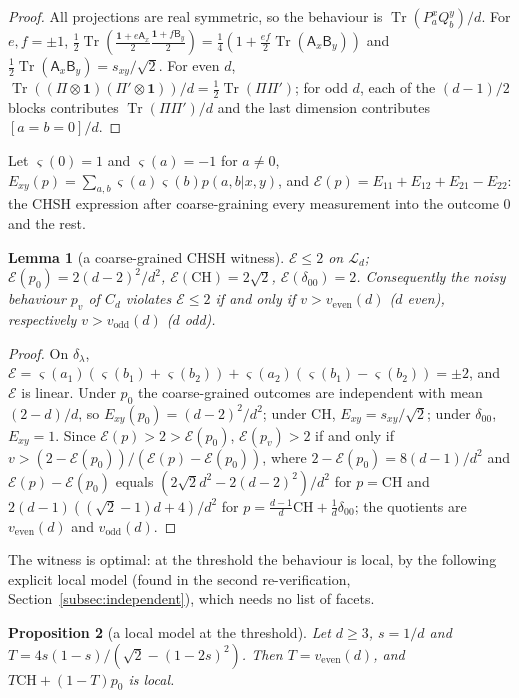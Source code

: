 \documentclass[11pt]{article}
\newtheorem{lemma}{Lemma}[section]
\newtheorem{proposition}[lemma]{Proposition}
\theoremstyle{remark}
\numberwithin{equation}{section}
\newcommand{\Tr}{\operatorname{Tr}}
\newcommand{\one}{\mathbf{1}}
\newcommand{\cL}{\mathcal{L}}
\newcommand{\cE}{\mathcal{E}}
\newcommand{\veven}{v_{\mathrm{even}}}
\newcommand{\vodd}{v_{\mathrm{odd}}}
\newcommand{\CH}{\mathrm{CH}}
\newcommand{\sA}{\mathsf{A}}
\newcommand{\sB}{\mathsf{B}}
\begin{document}
\begin{proof}
All projections are real symmetric, so the behaviour is $\Tr(P^x_aQ^y_b)/d$. For $e,f=\pm1$,
$\frac12\Tr(\frac{\one+e\sA_x}2\frac{\one+f\sB_y}2)=\frac14(1+\frac{ef}2\Tr(\sA_x\sB_y))$ and
$\frac12\Tr(\sA_x\sB_y)=s_{xy}/\sqrt2$. For even $d$, $\Tr((\Pi\otimes\one)(\Pi'\otimes\one))/d=\frac12\Tr(\Pi\Pi')$; for odd
$d$, each of the $(d-1)/2$ blocks contributes $\Tr(\Pi\Pi')/d$ and the last dimension contributes $[a=b=0]/d$.
\end{proof}

Let $\varsigma(0)=1$ and $\varsigma(a)=-1$ for $a\ne0$, $E_{xy}(p)=\sum_{a,b}\varsigma(a)\varsigma(b)p(a,b|x,y)$, and
$\cE(p)=E_{11}+E_{12}+E_{21}-E_{22}$: the CHSH expression after coarse-graining every measurement into the outcome $0$
and the rest.

\begin{lemma}[a coarse-grained CHSH witness]\label{lem:witness}
$\cE\le2$ on $\cL_d$; $\cE(p_0)=2(d-2)^2/d^2$, $\cE(\CH)=2\sqrt2$, $\cE(\delta_{00})=2$. Consequently the noisy behaviour
$p_v$ of $C_d$ violates $\cE\le2$ if and only if $v>\veven(d)$ \textup{(}$d$ even\textup{)}, respectively $v>\vodd(d)$
\textup{(}$d$ odd\textup{)}.
\end{lemma}

\begin{proof}
On $\delta_\lambda$, $\cE=\varsigma(a_1)(\varsigma(b_1)+\varsigma(b_2))+\varsigma(a_2)(\varsigma(b_1)-\varsigma(b_2))=\pm2$, and $\cE$ is
linear. Under $p_0$ the coarse-grained outcomes are independent with mean $(2-d)/d$, so $E_{xy}(p_0)=(d-2)^2/d^2$; under
$\CH$, $E_{xy}=s_{xy}/\sqrt2$; under $\delta_{00}$, $E_{xy}=1$. Since $\cE(p)>2>\cE(p_0)$, $\cE(p_v)>2$ if and only if
$v>(2-\cE(p_0))/(\cE(p)-\cE(p_0))$, where $2-\cE(p_0)=8(d-1)/d^2$ and $\cE(p)-\cE(p_0)$ equals $(2\sqrt2d^2-2(d-2)^2)/d^2$
for $p=\CH$ and $2(d-1)((\sqrt2-1)d+4)/d^2$ for $p=\frac{d-1}d\CH+\frac1d\delta_{00}$; the quotients are $\veven(d)$ and
$\vodd(d)$.
\end{proof}

The witness is optimal: at the threshold the behaviour is local, by the following explicit local model (found in the
second re-verification, Section~\ref{subsec:independent}), which needs no list of facets.

\begin{proposition}[a local model at the threshold]\label{prop:flagmodel}
Let $d\ge3$, $s=1/d$ and $T=4s(1-s)/(\sqrt2-(1-2s)^2)$. Then $T=\veven(d)$, and $T\CH+(1-T)p_0$ is local.
\end{proposition}
\end{document}
